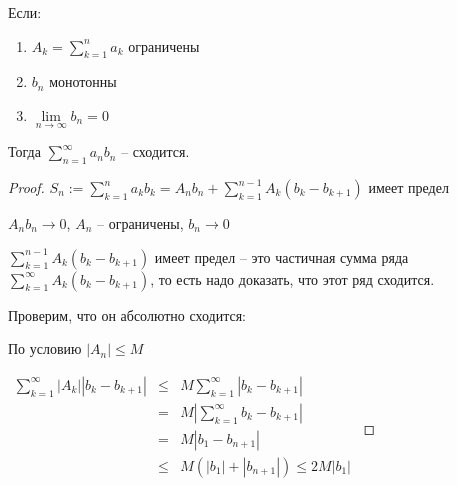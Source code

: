 \begin{theorem} \thmslashn 

    Если: 
    
    \begin{enumerate}
        \item $A_k = \sum\limits_{k=1}^{n} a_k$ ограничены
        \item $b_n$ монотонны
        \item $\lim\limits_{n \to \infty} b_n = 0$
    \end{enumerate}

	Тогда $\sum\limits_{n=1}^{\infty} a_nb_n$ -- сходится.
	
	\begin{proof} \thmslashn
	
	    $S_n := \sum\limits_{k=1}^{n} a_kb_k = A_nb_n + \sum\limits_{k=1}^{n-1} A_k(b_k - b_{k+1}) $ имеет предел
	    
	    $A_nb_n \to 0$, $A_n$ -- ограничены, $b_n \to 0$
	    
	    $\sum\limits_{k=1}^{n-1} A_k(b_k - b_{k+1}) $ имеет предел -- это частичная сумма ряда $\sum\limits_{k=1}^{\infty} A_k(b_k - b_{k+1})$, то есть надо доказать, что этот ряд сходится.
	    
	    Проверим, что он абсолютно сходится: 
	    
	    По условию $|A_n| \le M$
	    
	    $\begin{array}{rcll}
    	\sum\limits_{k=1}^{\infty} |A_k||b_k - b_{k+1}| &\le& M\sum\limits_{k=1}^{\infty} |b_k - b_{k+1}| \\
    	                             &=& M|\sum\limits_{k=1}^{\infty} b_k - b_{k+1}| \\
    	                             &=& M|b_1 - b_{n+1}| \\
    	                             &\le& M(|b_1| + |b_{n+1}|) \le 2M|b_1| \\
    	\end{array}$
	    
    \end{proof}

\end{theorem}

